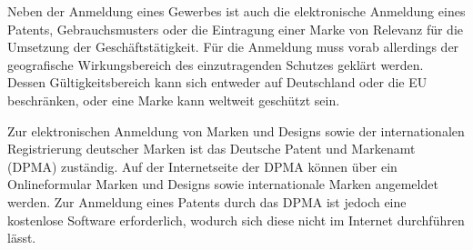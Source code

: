 Neben der Anmeldung eines Gewerbes ist auch die elektronische Anmeldung eines Patents, Gebrauchsmusters oder die Eintragung einer Marke von Relevanz für die Umsetzung der Geschäftstätigkeit. 
Für die Anmeldung muss vorab allerdings der geografische Wirkungsbereich des einzutragenden Schutzes geklärt werden. 
Dessen Gültigkeitsbereich kann sich entweder auf Deutschland oder die EU beschränken, oder eine Marke kann weltweit geschützt sein.

Zur elektronischen Anmeldung von Marken und Designs sowie der internationalen Registrierung deutscher Marken ist das Deutsche Patent und Markenamt (DPMA) zuständig. 
Auf der Internetseite der DPMA können über ein Onlineformular Marken und Designs sowie internationale Marken angemeldet werden. 
Zur Anmeldung eines Patents durch das DPMA ist jedoch eine kostenlose Software erforderlich, wodurch sich diese nicht im Internet durchführen lässt. 